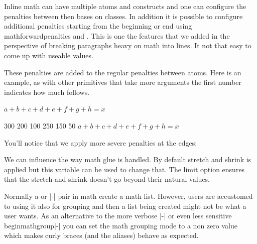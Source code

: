 \stopnewprimitive

\startnewprimitive[title={\prm {mathforwardpenalties}}]

Inline math can have multiple atoms and constructs and one can configure the
penalties between then bases on classes. In addition it is possible to configure
additional penalties starting from the beginning or end using \prm
{mathforwardpenalties} and . This is one the features
that we added in the perspective of breaking paragraphs heavy on math into lines.
It not that easy to come up with useable values.

These penalties are added to the regular penalties between atoms. Here is an
example, as with other primitives that take more arguments the first number
indicates how much follows.

\startbuffer
$ a + b + c + d + e + f + g + h = x $\par
{} 300 200 100
 250 150  50
$ a + b + c + d + e + f + g + h = x $\par
\stopbuffer

\typebuffer

You'll notice that we apply more severe penalties at the edges:

{\showmakeup[penalty]\multiply\glyphscale\plustwo \getbuffer}


\stopnewprimitive

\startnewprimitive[title={\prm {mathgluemode}}]

We can influence the way math glue is handled. By default stretch and shrink is applied but
this variable can be used to change that. The limit option ensures that the stretch and shrink
doesn't go beyond their natural values.


\stopnewprimitive

\startnewprimitive[title={\prm {mathgroupingmode}}]

Normally a \type {{}} or \type {\bgroup}|-|\type {\egroup} pair in math create a
math list. However, users are accustomed to using it also for grouping and then a
list being created might not be what a user wants. As an alternative to the more
verbose |-| or even less sensitive \prm
{beginmathgroup}|-| you can set the math grouping mode to a
non zero value which makes curly braces (and the aliases) behave as expected.

\stopnewprimitive

